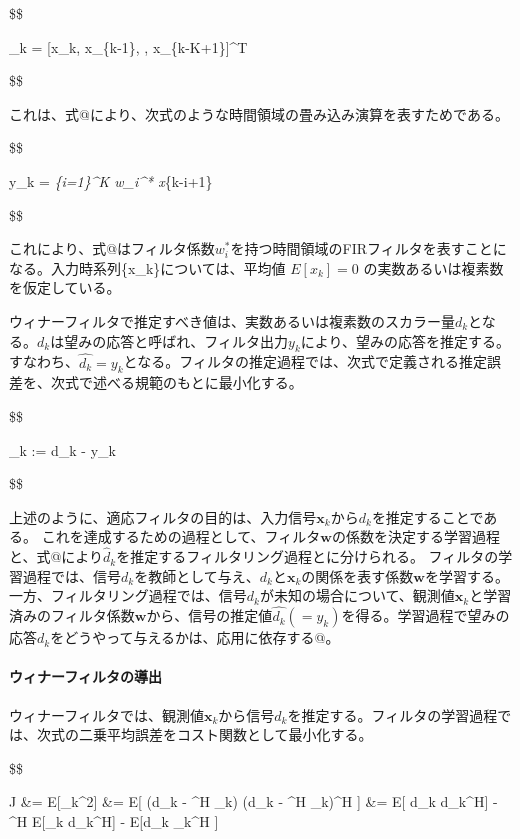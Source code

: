 \$\$

\_k = {[}x\_k, x\_\{k-1\}, \cdots, x\_\{k-K+1\}{]}\^{}T

\$\$

これは、式@により、次式のような時間領域の畳み込み演算を表すためである。

\$\$

y\_k = \sum\emph{\{i=1\}\^{}K w\_i\^{}* x}\{k-i+1\}

\$\$

これにより、式@はフィルタ係数\({w_i^*}\)を持つ時間領域のFIRフィルタを表すことになる。入力時系列\{x\_k\}については、平均値
\(E[x_k]=0\) の実数あるいは複素数を仮定している。

ウィナーフィルタで推定すべき値は、実数あるいは複素数のスカラー量\(d_k\)となる。\(d_k\)は望みの応答と呼ばれ、フィルタ出力\(y_k\)により、望みの応答を推定する。すなわち、\(\hat{d_k} = y_k\)となる。フィルタの推定過程では、次式で定義される推定誤差を、次式で述べる規範のもとに最小化する。

\$\$

\epsilon\_k := d\_k - y\_k

\$\$

上述のように、適応フィルタの目的は、入力信号\(\bm{x}_k\)から\(d_k\)を推定することである。
これを達成するための過程として、フィルタ\(\bm{w}\)の係数を決定する学習過程と、式@により\(\hat{d}_k\)を推定するフィルタリング過程とに分けられる。
フィルタの学習過程では、信号\(d_k\)を教師として与え、\(d_k\)と\(\bm{x}_k\)の関係を表す係数\(\bm{w}\)を学習する。
一方、フィルタリング過程では、信号\(d_k\)が未知の場合について、観測値\(\bm{x}_k\)と学習済みのフィルタ係数\(\bm{w}\)から、信号の推定値\(\hat{d_k} (= y_k)\)を得る。学習過程で望みの応答\(d_k\)をどうやって与えるかは、応用に依存する@。

\hypertarget{ux30a6ux30a3ux30caux30fcux30d5ux30a3ux30ebux30bfux306eux5c0eux51fa}{%
\paragraph{ウィナーフィルタの導出}\label{ux30a6ux30a3ux30caux30fcux30d5ux30a3ux30ebux30bfux306eux5c0eux51fa}}

ウィナーフィルタでは、観測値\(\bm{x}_k\)から信号\(d_k\)を推定する。フィルタの学習過程では、次式の二乗平均誤差をコスト関数として最小化する。

\$\$

J \&= E{[}\textbar{}\epsilon\_k\textbar\^{}2{]} \&= E{[} (d\_k -
\^{}H \_k) (d\_k - \^{}H \_k)\^{}H {]} \&= E{[}
d\_k d\_k\^{}H{]} - \^{}H E{[}\_k d\_k\^{}H{]} - E{[}d\_k
\_k\^{}H {]} 

